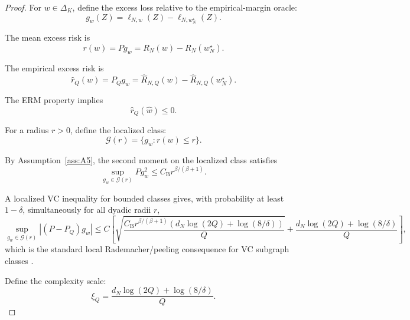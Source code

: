 \documentclass{article} %
\providecommand{\simplex}{\Delta_K}
\providecommand{\Risk}{R}
\providecommand{\what}{\widehat{w}}
\begin{document}
\begin{proof}
For \(w\in\simplex\), define the excess loss relative to the
empirical-margin oracle:
\begin{equation}
\label{eq:prop1-proof-g}
g_w(Z)
=
\ell_{N,w}(Z)-\ell_{N,w_N^\star}(Z).
\end{equation}

The mean excess risk is
\begin{equation}
\label{eq:prop1-proof-r}
r(w)
=
Pg_w
=
\Risk_N(w)-\Risk_N(w_N^\star).
\end{equation}

The empirical excess risk is
\begin{equation}
\label{eq:prop1-proof-rhat}
\widehat r_Q(w)
=
P_Qg_w
=
\widehat{\Risk}_{N,Q}(w)-\widehat{\Risk}_{N,Q}(w_N^\star).
\end{equation}

The ERM property implies
\begin{equation}
\label{eq:prop1-proof-erm}
\widehat r_Q(\what)
\le
0 .
\end{equation}

For a radius \(r>0\), define the localized class:
\begin{equation}
\label{eq:prop1-proof-local}
\mathcal G(r)
=
\{g_w:r(w)\le r\}.
\end{equation}

By Assumption~\ref{ass:A5}, the second moment on the localized class satisfies
\begin{equation}
\label{eq:prop1-proof-var}
\sup_{g_w\in\mathcal G(r)}
Pg_w^2
\le
C_{\mathrm B}r^{\beta/(\beta+1)} .
\end{equation}

A localized VC inequality for bounded classes gives, with probability at least
\(1-\delta\), simultaneously for all dyadic radii \(r\),
\begin{equation}
\label{eq:prop1-proof-localvc}
\sup_{g_w\in\mathcal G(r)}
|(P-P_Q)g_w|
\le
C
\left[
\sqrt{
\frac{
C_{\mathrm B}r^{\beta/(\beta+1)}
\left(d_N\log(2Q)+\log(8/\delta)\right)
}{Q}}
+
\frac{d_N\log(2Q)+\log(8/\delta)}{Q}
\right],
\end{equation}
which is the standard local Rademacher/peeling consequence for VC subgraph
classes \cite{bartlett2005local,koltchinskii2006local,massart2006risk}.

Define the complexity scale:
\begin{equation}
\label{eq:prop1-proof-xi}
\xi_Q
=
\frac{
d_N\log(2Q)+\log(8/\delta)
}{Q}.
\end{equation}


\end{proof}
\end{document}
